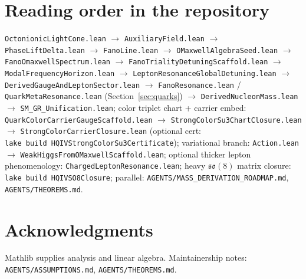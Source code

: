 \documentclass[11pt]{article}
\begin{document}
\section*{Reading order in the repository}

\texttt{OctonionicLightCone.lean} $\rightarrow$ \texttt{AuxiliaryField.lean} $\rightarrow$ \texttt{PhaseLiftDelta.lean} $\rightarrow$ \texttt{FanoLine.lean} $\rightarrow$ \texttt{OMaxwellAlgebraSeed.lean} $\rightarrow$ \texttt{FanoOmaxwellSpectrum.lean} $\rightarrow$ \texttt{FanoTrialityDetuningScaffold.lean} $\rightarrow$ \texttt{ModalFrequencyHorizon.lean} $\rightarrow$ \texttt{LeptonResonanceGlobalDetuning.lean} $\rightarrow$ \texttt{DerivedGaugeAndLeptonSector.lean} $\rightarrow$ \texttt{FanoResonance.lean} / \texttt{QuarkMetaResonance.lean} (Section~\ref{sec:quarks}) $\rightarrow$ \texttt{DerivedNucleonMass.lean} $\rightarrow$ \texttt{SM\_GR\_Unification.lean}; color triplet chart + carrier embed: \texttt{QuarkColorCarrierGaugeScaffold.lean} $\rightarrow$ \texttt{StrongColorSu3ChartClosure.lean} $\rightarrow$ \texttt{StrongColorCarrierClosure.lean} (optional cert: \texttt{lake\ build\ HQIVStrongColorSu3Certificate}); variational branch: \texttt{Action.lean} $\rightarrow$ \texttt{WeakHiggsFromOMaxwellScaffold.lean}; optional thicker lepton phenomenology: \texttt{ChargedLeptonResonance.lean}; heavy $\mathfrak{so}(8)$ matrix closure: \texttt{lake\ build\ HQIVSO8Closure}; parallel: \texttt{AGENTS/MASS\_DERIVATION\_ROADMAP.md}, \texttt{AGENTS/THEOREMS.md}.

\section*{Acknowledgments}
Mathlib supplies analysis and linear algebra. Maintainership notes: \texttt{AGENTS/ASSUMPTIONS.md}, \texttt{AGENTS/THEOREMS.md}.
\end{document}

